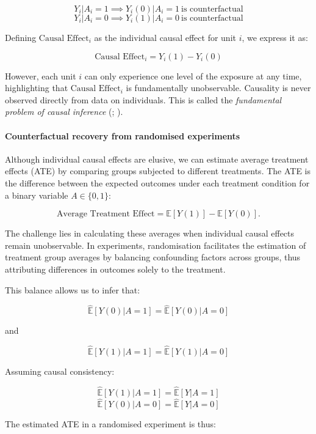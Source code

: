 \documentclass[
  singlecolumn]{article}
\let\oldparagraph\paragraph
\renewcommand{\paragraph}[1]{\oldparagraph{#1}\mbox{}}
\begin{document}
\[
Y_i|A_i = 1 \implies Y_i(0)|A_i = 1~ \text{is counterfactual}
\] \[
Y_i|A_i = 0 \implies Y_i(1)|A_i = 0~ \text{is counterfactual}
\]

Defining \(\text{Causal Effect}_i\) as the individual causal effect for
unit \(i\), we express it as:

\[
\text{Causal Effect}_i = Y_i(1) - Y_i(0)
\]

However, each unit \(i\) can only experience one level of the exposure
at any time, highlighting that \(\text{Causal Effect}_i\) is
fundamentally unobservable. Causality is never observed directly from
data on individuals. This is called the \emph{fundamental problem of
causal inference} (;
).

\paragraph{Counterfactual recovery from randomised
experiments}\label{counterfactual-recovery-from-randomised-experiments}

Although individual causal effects are elusive, we can estimate average
treatment effects (ATE) by comparing groups subjected to different
treatments. The ATE is the difference between the expected outcomes
under each treatment condition for a binary variable \(A \in \{0,1\}\):

\[
\text{Average Treatment Effect}  = \mathbb{E}[Y(1)] - \mathbb{E}[Y(0)].
\]

The challenge lies in calculating these averages when individual causal
effects remain unobservable. In experiments, randomisation facilitates
the estimation of treatment group averages by balancing confounding
factors across groups, thus attributing differences in outcomes solely
to the treatment.

This balance allows us to infer that:

\[
\widehat{\mathbb{E}}[Y(0) | A = 1] = \widehat{\mathbb{E}}[Y(0) | A = 0]
\]

and

\[
\widehat{\mathbb{E}}[Y(1) | A = 1] = \widehat{\mathbb{E}}[Y(1) | A = 0]
\]

Assuming causal consistency:

\[\widehat{\mathbb{E}}[Y(1) | A = 1] = \widehat{\mathbb{E}}[Y| A = 1]\]
\[\widehat{\mathbb{E}}[Y(0) | A = 0] = \widehat{\mathbb{E}}[Y| A = 0]\]

The estimated ATE in a randomised experiment is thus:
\end{document}
